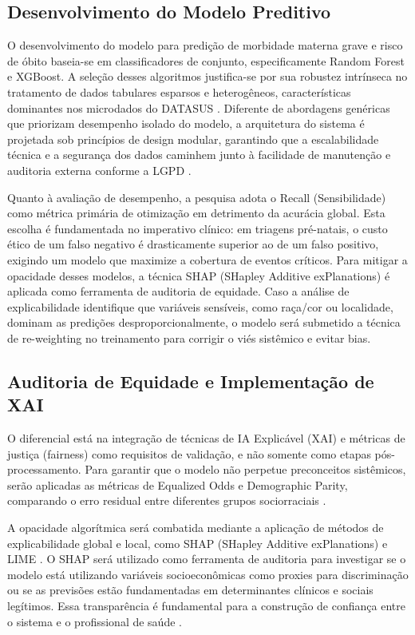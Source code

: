 \documentclass[12pt]{article}
\begin{document}
\subsection{Desenvolvimento do Modelo Preditivo}
O desenvolvimento do modelo para predição de morbidade materna grave e risco de óbito baseia-se em classificadores de conjunto, especificamente Random Forest e XGBoost. A seleção desses algoritmos justifica-se por sua robustez intrínseca no tratamento de dados tabulares esparsos e heterogêneos, características dominantes nos microdados do DATASUS \cite{Cetin2020}. Diferente de abordagens genéricas que priorizam desempenho isolado do modelo, a arquitetura do sistema é projetada sob princípios de design modular, garantindo que a escalabilidade técnica e a segurança dos dados caminhem junto à facilidade de manutenção e auditoria externa conforme a LGPD \cite{dosReis2024}.

Quanto à avaliação de desempenho, a pesquisa adota o Recall (Sensibilidade) como métrica primária de otimização em detrimento da acurácia global. Esta escolha é fundamentada no imperativo clínico: em triagens pré-natais, o custo ético de um falso negativo é drasticamente superior ao de um falso positivo, exigindo um modelo que maximize a cobertura de eventos críticos. Para mitigar a opacidade desses modelos, a técnica SHAP (SHapley Additive exPlanations)\cite{Lundberg2017} é aplicada como ferramenta de auditoria de equidade. Caso a análise de explicabilidade identifique que variáveis sensíveis, como raça/cor ou localidade, dominam as predições desproporcionalmente, o modelo será submetido a técnica de re-weighting no treinamento para corrigir o viés sistêmico e evitar bias.

\subsection{Auditoria de Equidade e Implementação de XAI}
O diferencial está na integração de técnicas de IA Explicável (XAI) e métricas de justiça (fairness) como requisitos de validação, e não somente como etapas pós-processamento. Para garantir que o modelo não perpetue preconceitos sistêmicos, serão aplicadas as métricas de Equalized Odds e Demographic Parity, comparando o erro residual entre diferentes grupos sociorraciais \cite{FairnessAI2023, ViesAlgoritmico2024}.

A opacidade algorítmica será combatida mediante a aplicação de métodos de explicabilidade global e local, como SHAP (SHapley Additive exPlanations) e LIME \cite{Rajpurkar2022, ExplainableAI2023}. O SHAP será utilizado como ferramenta de auditoria para investigar se o modelo está utilizando variáveis socioeconômicas como proxies para discriminação ou se as previsões estão fundamentadas em determinantes clínicos e sociais legítimos. Essa transparência é fundamental para a construção de confiança entre o sistema e o profissional de saúde \cite{Shneiderman2021, Lekadir2023}.
\end{document}
